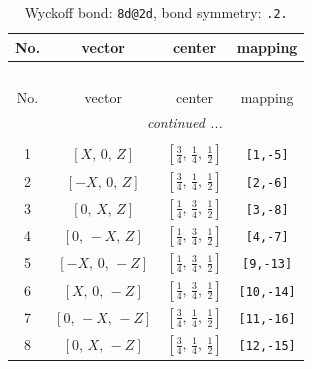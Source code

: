 \documentclass[fleqn,8pt]{jsarticle}
\begin{document}
\begin{longtable}{cccc}
\caption{Wyckoff bond: {\tt 8d@2d}, bond symmetry: {\tt .2.}}
 \\
 \hline \hline
No. & vector & center & mapping \\ \hline \endfirsthead

\multicolumn{3}{l}{\tablename\ \thetable{}} \\
 \hline \hline
No. & vector & center & mapping \\ \hline \endhead

 \hline \hline
\multicolumn{3}{r}{\footnotesize\it continued ...} \\ \endfoot

 \hline \hline
\multicolumn{3}{r}{} \\ \endlastfoot

1 & $\left[ X,\, 0,\, Z \right]$ & $\left[ \frac{3}{4},\, \frac{1}{4},\, \frac{1}{2} \right]$ & {\tt [1,-5]} \\ \hline
2 & $\left[ - X,\, 0,\, Z \right]$ & $\left[ \frac{3}{4},\, \frac{1}{4},\, \frac{1}{2} \right]$ & {\tt [2,-6]} \\ \hline
3 & $\left[ 0,\, X,\, Z \right]$ & $\left[ \frac{1}{4},\, \frac{3}{4},\, \frac{1}{2} \right]$ & {\tt [3,-8]} \\ \hline
4 & $\left[ 0,\, - X,\, Z \right]$ & $\left[ \frac{1}{4},\, \frac{3}{4},\, \frac{1}{2} \right]$ & {\tt [4,-7]} \\ \hline
5 & $\left[ - X,\, 0,\, - Z \right]$ & $\left[ \frac{1}{4},\, \frac{3}{4},\, \frac{1}{2} \right]$ & {\tt [9,-13]} \\ \hline
6 & $\left[ X,\, 0,\, - Z \right]$ & $\left[ \frac{1}{4},\, \frac{3}{4},\, \frac{1}{2} \right]$ & {\tt [10,-14]} \\ \hline
7 & $\left[ 0,\, - X,\, - Z \right]$ & $\left[ \frac{3}{4},\, \frac{1}{4},\, \frac{1}{2} \right]$ & {\tt [11,-16]} \\ \hline
8 & $\left[ 0,\, X,\, - Z \right]$ & $\left[ \frac{3}{4},\, \frac{1}{4},\, \frac{1}{2} \right]$ & {\tt [12,-15]} \\
\end{longtable}
\renewcommand{\arraystretch}{1.2}
\end{document}
